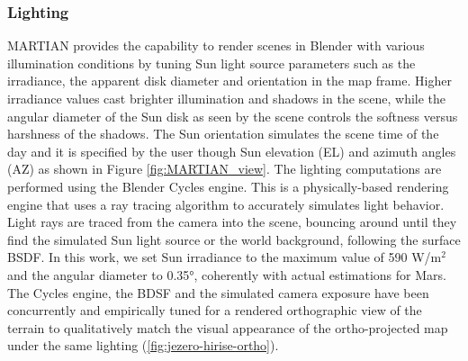 \subsubsection{Lighting}
\label{subsubsec:lighting}

MARTIAN provides the capability to render scenes in Blender with various illumination conditions by tuning Sun light source parameters such as the irradiance, the apparent disk diameter and orientation in the map frame. Higher irradiance values cast brighter illumination and shadows in the scene, while the angular diameter of the Sun disk as seen by the scene controls the softness versus harshness of the shadows. The Sun orientation simulates the scene time of the day and it is specified by the user though Sun elevation (EL) and azimuth angles (AZ) as shown in Figure \ref{fig:MARTIAN_view}. The lighting computations are performed using the Blender Cycles engine. This is a physically-based rendering engine that uses a ray tracing algorithm to accurately simulates light behavior. Light rays are traced from the camera into the scene, bouncing around until they find the simulated Sun light source or the world background, following the surface BSDF. In this work, we set Sun irradiance to the maximum value of 590 W/m$^2$ and the angular diameter to 0.35°, coherently with actual estimations for Mars. The Cycles engine, the BDSF and the simulated camera exposure have been concurrently and empirically tuned for a rendered orthographic view of the terrain to qualitatively match the visual appearance of the ortho-projected map under the same lighting (\ref{fig:jezero-hirise-ortho}).


